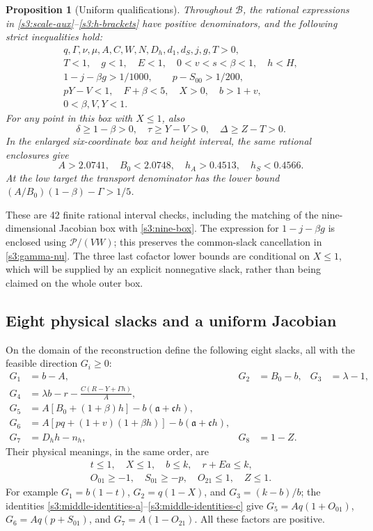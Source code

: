 \documentclass[11pt,reqno]{amsart}
\newtheorem{proposition}[theorem]{Proposition}
\theoremstyle{definition}
\theoremstyle{remark}
\begin{document}
\begin{proposition}[Uniform qualifications]\label{s3:qualifications}
Throughout \(\mathcal B\), the rational expressions in
\eqref{s3:scale-aux}--\eqref{s3:h-brackets} have positive denominators,
and the following strict inequalities hold:
\begin{gather*}
 q,\Gamma,\nu,\mu,A,C,W,N,D_h,d_1,d_S,j,g,T>0,\\
 T<1,\quad g<1,\quad E<1,\quad0<v<s<\beta<1,\quad h<H,\\
 1-j-\beta g>1/1000,\qquad p-S_{00}>1/200,\\
 pY-V<1,\quad F+\beta<5,\quad X>0,\quad b>1+v,\\
 0<\beta,V,Y<1.
\end{gather*}
For any point in this box with \(X\le1\), also
\[
 \delta\ge1-\beta>0,\quad
 \tau\ge Y-V>0,\quad
 \Delta\ge Z-T>0.
\]
In the enlarged six-coordinate box and height interval, the same
rational enclosures give
\[
 A>2.0741,\quad B_0<2.0748,\quad
 h_A>0.4513,\quad h_S<0.4566.
\]
At the low target the transport denominator has the lower bound
\((A/B_0)(1-\beta)-\Gamma>1/5\).
\end{proposition}

These are 42 finite rational interval checks, including the matching
of the nine-dimensional Jacobian box with \eqref{s3:nine-box}.
The expression for \(1-j-\beta g\) is enclosed using
\(\mathcal P/(VW)\); this preserves the common-slack cancellation
in \eqref{s3:gamma-nu}. The three last cofactor lower bounds are
conditional on \(X\le1\), which will be supplied by an explicit
nonnegative slack, rather than being claimed on the whole outer box.

\subsection{Eight physical slacks and a uniform Jacobian}
\label{s3:slack-section}

On the domain of the reconstruction define the following eight
slacks, all with the feasible direction \(G_i\ge0\):
\begin{equation}\label{s3:eight-slacks}
\begin{aligned}
 G_1&=b-A,&G_2&=B_0-b,&G_3&=\lambda-1,\\
 G_4&=\lambda b-r-\frac{C(R-Y+\Gamma h)}A,\\
 G_5&=A[B_0+(1+\beta)h]-b(\mathfrak a+\mathfrak c h),\\
 G_6&=A[pq+(1+v)(1+\beta h)]-b(\mathfrak a+\mathfrak c h),\\
 G_7&=D_hh-n_h,&G_8&=1-Z.
\end{aligned}
\end{equation}
Their physical meanings, in the same order, are
\[
 \begin{gathered}
 t\le1,\quad X\le1,\quad b\le k,\quad r+Ea\le k,\\
 O_{01}\ge-1,\quad S_{01}\ge-p,\quad O_{21}\le1,\quad Z\le1.
 \end{gathered}
\]
For example \(G_1=b(1-t)\), \(G_2=q(1-X)\), and
\(G_3=(k-b)/b\); the identities
\eqref{s3:middle-identities-a}--\eqref{s3:middle-identities-c}
give \(G_5=Aq(1+O_{01})\), \(G_6=Aq(p+S_{01})\),
and \(G_7=A(1-O_{21})\). All these factors are positive.
\end{document}
